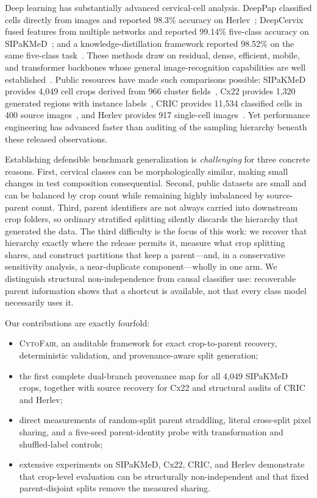 \documentclass[conference]{IEEEtran}
\newcommand{\cytofair}{\textsc{CytoFair}}
\begin{document}
Deep learning has substantially advanced cervical-cell analysis.
DeepPap classified cells directly from images and reported 98.3\% accuracy on Herlev~\cite{zhang2017deeppap}; DeepCervix fused features from multiple networks and reported 99.14\% five-class accuracy on SIPaKMeD~\cite{rahaman2021deepcervix}; and a knowledge-distillation framework reported 98.52\% on the same five-class task~\cite{gao2022knowledge}.
These methods draw on residual, dense, efficient, mobile, and transformer backbones whose general image-recognition capabilities are well established~\cite{he2016resnet,huang2017densenet,sandler2018mobilenetv2,tan2019efficientnet,dosovitskiy2021vit}.
Public resources have made such comparisons possible: SIPaKMeD provides 4,049 cell crops derived from 966 cluster fields~\cite{plissiti2018sipakmed}, Cx22 provides 1,320 generated regions with instance labels~\cite{liu2022cx22}, CRIC provides 11,534 classified cells in 400 source images~\cite{rezende2021cric}, and Herlev provides 917 single-cell images~\cite{jantzen2005pap}.
Yet performance engineering has advanced faster than auditing of the sampling hierarchy beneath these released observations.

Establishing defensible benchmark generalization is \emph{challenging} for three concrete reasons.
First, cervical classes can be morphologically similar, making small changes in test composition consequential.
Second, public datasets are small and can be balanced by crop count while remaining highly imbalanced by source-parent count.
Third, parent identifiers are not always carried into downstream crop folders, so ordinary stratified splitting silently discards the hierarchy that generated the data.
The third difficulty is the focus of this work: we recover that hierarchy exactly where the release permits it, measure what crop splitting shares, and construct partitions that keep a parent---and, in a conservative sensitivity analysis, a near-duplicate component---wholly in one arm.
We distinguish structural non-independence from causal classifier use: recoverable parent information shows that a shortcut is available, not that every class model necessarily uses it.

Our contributions are exactly fourfold:
\begin{itemize}
    \item \cytofair, an auditable framework for exact crop-to-parent recovery, deterministic validation, and provenance-aware split generation;
    \item the first complete dual-branch provenance map for all 4,049 SIPaKMeD crops, together with source recovery for Cx22 and structural audits of CRIC and Herlev;
    \item direct measurements of random-split parent straddling, literal cross-split pixel sharing, and a five-seed parent-identity probe with transformation and shuffled-label controls;
    \item extensive experiments on SIPaKMeD, Cx22, CRIC, and Herlev demonstrate that crop-level evaluation can be structurally non-independent and that fixed parent-disjoint splits remove the measured sharing.
\end{itemize}
\end{document}
